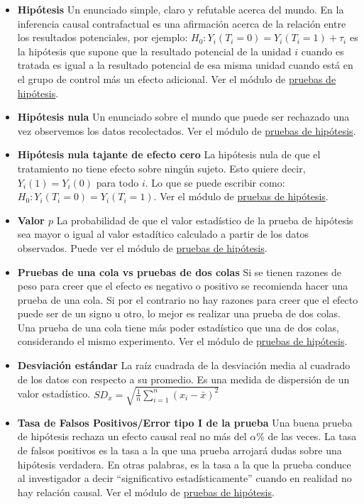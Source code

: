 \documentclass[12pt,spanish,]{book}
\providecommand{\tightlist}{%
  \setlength{\itemsep}{0pt}\setlength{\parskip}{0pt}}
\begin{document}
\begin{itemize}
\tightlist
\item
  \textbf{Hipótesis} Un enunciado simple, claro y refutable acerca del mundo. En la inferencia causal contrafactual es una afirmación acerca de la relación entre los resultados potenciales, por ejemplo: \(H_0: Y_i(T_i=0) = Y_i(T_i=1) + \tau_i\) es la hipótesis que supone que la resultado potencial de la unidad \(i\) cuando es tratada es igual a la
  resultado potencial de esa misma unidad cuando está en el grupo de control más un efecto adicional. Ver el módulo de \href{pruebas-de-hipótesis.html}{pruebas de hipótesis}.
\item
  \textbf{Hipótesis nula} Un enunciado sobre el mundo que puede ser rechazado una vez observemos los datos recolectados. Ver el módulo de \href{pruebas-de-hipótesis.html}{pruebas de hipótesis}.
\item
  \textbf{Hipótesis nula tajante de efecto cero} La hipótesis nula de que el tratamiento no tiene efecto sobre ningún sujeto. Esto quiere decir, \(Y_i(1)=Y_i(0)\) para todo \(i\). Lo que se puede escribir como: \(H_0: Y_i(T_i=0) = Y_i(T_i=1)\). Ver el módulo de
  \href{pruebas-de-hipótesis.html}{pruebas de hipótesis}.
\item
  \textbf{Valor \(p\)} La probabilidad de que el valor estadístico de la prueba de hipótesis sea mayor o igual al valor estadítico calculado a partir de los datos observados. Puede ver el módulo de \href{pruebas-de-hipótesis.html}{pruebas de hipótesis}.
\item
  \textbf{Pruebas de una cola vs pruebas de dos colas} Si se tienen razones de peso para creer que el efecto es negativo o positivo se recomienda hacer una prueba de una cola.
  Si por el contrario no hay razones para creer que el efecto puede ser de un signo u otro, lo mejor es realizar una prueba de dos colas. Una prueba de una cola tiene más poder estadístico que una de dos colas, considerando el mismo experimento.
  Ver el módulo de \href{pruebas-de-hipótesis.html}{pruebas de hipótesis}.
\item
  \textbf{Desviación estándar} La raíz cuadrada de la desviación media al cuadrado de los datos con respecto a su promedio. Es una medida de dispersión de un valor estadístico.
  \(SD_x=\sqrt{\frac{1}{n}\sum_{i=1}^n(x_i-\bar{x})^2}\)
\item
  \textbf{Tasa de Falsos Positivos/Error tipo I de la prueba} Una buena prueba de hipótesis rechaza un efecto causal real no más del \(\alpha\)\% de las veces. La tasa de falsos positivos es la tasa a la que una prueba arrojará dudas sobre una hipótesis verdadera. En otras palabras, es la tasa a la que la prueba conduce al investigador a decir ``significativo estadísticamente'' cuando en realidad no hay relación causal. Ver el módulo de \href{pruebas-de-hipótesis.html}{pruebas de hipótesis}.

\end{itemize}
\end{document}
